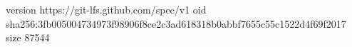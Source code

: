version https://git-lfs.github.com/spec/v1
oid sha256:3fb005004734973f98906f8ce2c3ad618318b0abbf7655c55c1522d4f69f2017
size 87544
